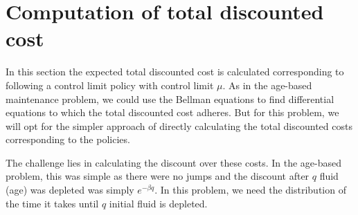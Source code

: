 \section{Computation of total discounted cost}
In this section the expected total discounted cost is calculated corresponding to following a control limit policy with control limit $\mu$.
As in the age-based maintenance problem, we could use the Bellman equations to find differential equations to which the total discounted cost adheres.
But for this problem, we will opt for the simpler approach of directly calculating the total discounted costs corresponding to the policies.

The challenge lies in calculating the discount over these costs.
In the age-based problem, this was simple as there were no jumps and the discount after $q$ fluid (age) was depleted was simply $e^{-\beta q}$.
In this problem, we need the distribution of the time it takes until $q$ initial fluid is depleted.

